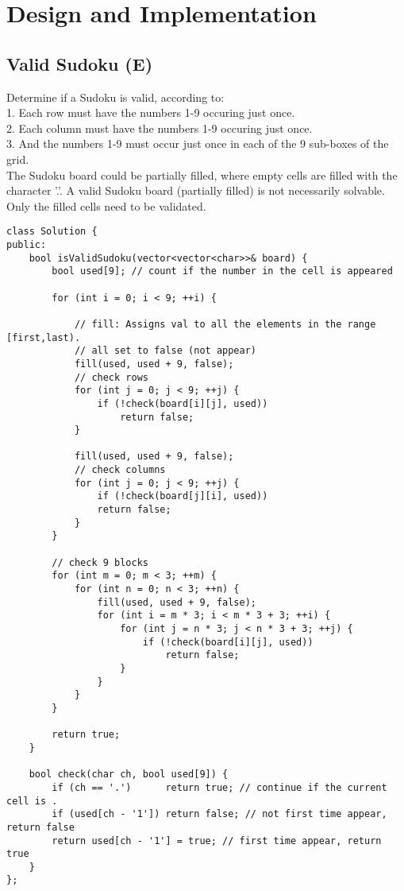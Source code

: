 \chapter{Design and Implementation}
\section{Valid Sudoku (E)}
Determine if a Sudoku is valid, according to:\\
1. Each row must have the numbers 1-9 occuring just once. \\
2. Each column must have the numbers 1-9 occuring just once. \\
3. And the numbers 1-9 must occur just once in each of the 9 sub-boxes of the grid. \\

The Sudoku board could be partially filled, where empty cells are filled with the character '.'.  A valid Sudoku board (partially filled) is not necessarily solvable. Only the filled cells need to be validated. \\

\begin{lstlisting}
class Solution {
public:
    bool isValidSudoku(vector<vector<char>>& board) {
        bool used[9]; // count if the number in the cell is appeared

        for (int i = 0; i < 9; ++i) {

            // fill: Assigns val to all the elements in the range [first,last).
            // all set to false (not appear)
            fill(used, used + 9, false);
            // check rows
            for (int j = 0; j < 9; ++j) { 
                if (!check(board[i][j], used))
                    return false;
            }

            fill(used, used + 9, false);
            // check columns
            for (int j = 0; j < 9; ++j) {               
                if (!check(board[j][i], used))
                return false;
            }
        }
        
        // check 9 blocks
        for (int m = 0; m < 3; ++m) {                   
            for (int n = 0; n < 3; ++n) {
                fill(used, used + 9, false);
                for (int i = m * 3; i < m * 3 + 3; ++i) {
                    for (int j = n * 3; j < n * 3 + 3; ++j) {
                        if (!check(board[i][j], used))
                            return false;
                    }
                }
            }
        }
        
        return true;
    }
    
    bool check(char ch, bool used[9]) {
        if (ch == '.')      return true; // continue if the current cell is .
        if (used[ch - '1']) return false; // not first time appear, return false
        return used[ch - '1'] = true; // first time appear, return true
    }
};
\end{lstlisting}


